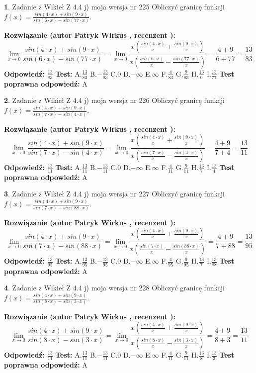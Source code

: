 \documentclass[12pt, a4paper]{article}
\theoremstyle{definition} %
\newtheorem{zad}{}
\newcommand{\zadStart}[1]{\begin{zad}#1\newline}
\newcommand{\zadStop}{\end{zad}}
\newcommand{\rozwStart}[2]{\noindent \textbf{Rozwiązanie (autor #1 , recenzent #2): }\newline}
\newcommand{\rozwStop}{\newline}
\newcommand{\odpStart}{\noindent \textbf{Odpowiedź:}\newline}
\newcommand{\odpStop}{\newline}
\newcommand{\testStart}{\noindent \textbf{Test:}\newline}
\newcommand{\testStop}{\newline}
\newcommand{\kluczStart}{\noindent \textbf{Test poprawna odpowiedź:}\newline}
\newcommand{\kluczStop}{\newline}
\begin{document}
\zadStart{Zadanie z Wikieł Z 4.4 j) moja wersja nr 225}
Obliczyć granicę funkcji $f(x)=\frac{sin(4\cdot x) +sin(9\cdot x)}{sin(6\cdot x) -sin(77\cdot x)}$.
\zadStop
\rozwStart{Patryk Wirkus}{}
$$\lim\limits_{x\to 0}\frac{sin(4\cdot x) +sin(9\cdot x)}{sin(6\cdot x) -sin(77\cdot x)}=\lim\limits_{x\to 0}\frac{x(\frac{sin(4\cdot x)}{x}+\frac{sin(9\cdot x)}{x})}{x(\frac{sin(6\cdot x)}{x}-\frac{sin(77\cdot x)}{x})}=\frac{4+9}{6+77} = \frac{13}{83}$$
\rozwStop
\odpStart
$\frac{13}{83}$
\odpStop
\testStart
A.$\frac{13}{83}$
B.$-\frac{13}{83}$
C.$0$
D.$-\infty$
E.$\infty$
F.$\frac{4}{83}$
G.$\frac{9}{83}$
H.$\frac{13}{6}$
I.$\frac{13}{77}$
\testStop
\kluczStart
A
\kluczStop



\zadStart{Zadanie z Wikieł Z 4.4 j) moja wersja nr 226}
Obliczyć granicę funkcji $f(x)=\frac{sin(4\cdot x) +sin(9\cdot x)}{sin(7\cdot x) -sin(4\cdot x)}$.
\zadStop
\rozwStart{Patryk Wirkus}{}
$$\lim\limits_{x\to 0}\frac{sin(4\cdot x) +sin(9\cdot x)}{sin(7\cdot x) -sin(4\cdot x)}=\lim\limits_{x\to 0}\frac{x(\frac{sin(4\cdot x)}{x}+\frac{sin(9\cdot x)}{x})}{x(\frac{sin(7\cdot x)}{x}-\frac{sin(4\cdot x)}{x})}=\frac{4+9}{7+4} = \frac{13}{11}$$
\rozwStop
\odpStart
$\frac{13}{11}$
\odpStop
\testStart
A.$\frac{13}{11}$
B.$-\frac{13}{11}$
C.$0$
D.$-\infty$
E.$\infty$
F.$\frac{4}{11}$
G.$\frac{9}{11}$
H.$\frac{13}{7}$
I.$\frac{13}{4}$
\testStop
\kluczStart
A
\kluczStop



\zadStart{Zadanie z Wikieł Z 4.4 j) moja wersja nr 227}
Obliczyć granicę funkcji $f(x)=\frac{sin(4\cdot x) +sin(9\cdot x)}{sin(7\cdot x) -sin(88\cdot x)}$.
\zadStop
\rozwStart{Patryk Wirkus}{}
$$\lim\limits_{x\to 0}\frac{sin(4\cdot x) +sin(9\cdot x)}{sin(7\cdot x) -sin(88\cdot x)}=\lim\limits_{x\to 0}\frac{x(\frac{sin(4\cdot x)}{x}+\frac{sin(9\cdot x)}{x})}{x(\frac{sin(7\cdot x)}{x}-\frac{sin(88\cdot x)}{x})}=\frac{4+9}{7+88} = \frac{13}{95}$$
\rozwStop
\odpStart
$\frac{13}{95}$
\odpStop
\testStart
A.$\frac{13}{95}$
B.$-\frac{13}{95}$
C.$0$
D.$-\infty$
E.$\infty$
F.$\frac{4}{95}$
G.$\frac{9}{95}$
H.$\frac{13}{7}$
I.$\frac{13}{88}$
\testStop
\kluczStart
A
\kluczStop



\zadStart{Zadanie z Wikieł Z 4.4 j) moja wersja nr 228}
Obliczyć granicę funkcji $f(x)=\frac{sin(4\cdot x) +sin(9\cdot x)}{sin(8\cdot x) -sin(3\cdot x)}$.
\zadStop
\rozwStart{Patryk Wirkus}{}
$$\lim\limits_{x\to 0}\frac{sin(4\cdot x) +sin(9\cdot x)}{sin(8\cdot x) -sin(3\cdot x)}=\lim\limits_{x\to 0}\frac{x(\frac{sin(4\cdot x)}{x}+\frac{sin(9\cdot x)}{x})}{x(\frac{sin(8\cdot x)}{x}-\frac{sin(3\cdot x)}{x})}=\frac{4+9}{8+3} = \frac{13}{11}$$
\rozwStop
\odpStart
$\frac{13}{11}$
\odpStop
\testStart
A.$\frac{13}{11}$
B.$-\frac{13}{11}$
C.$0$
D.$-\infty$
E.$\infty$
F.$\frac{4}{11}$
G.$\frac{9}{11}$
H.$\frac{13}{8}$
I.$\frac{13}{3}$
\testStop
\kluczStart
A
\kluczStop
\end{document}
